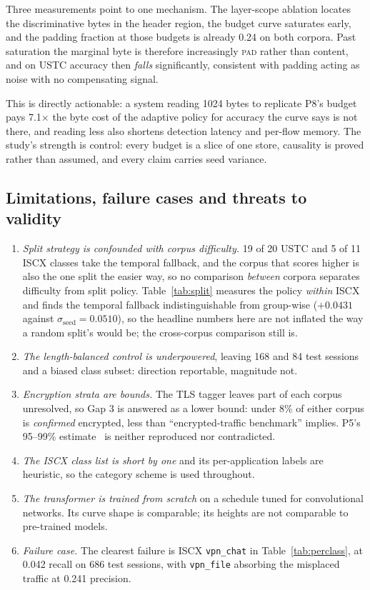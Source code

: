 \documentclass[pdflatex,sn-mathphys-num]{sn-jnl}
\theoremstyle{thmstyleone}%
\theoremstyle{thmstylethree}%
\begin{document}
Three measurements point to one mechanism. The layer-scope ablation locates
the discriminative bytes in the header region, the budget curve saturates
early, and the padding fraction at those budgets is already 0.24 on both
corpora. Past saturation the marginal byte is therefore increasingly
\textsc{pad} rather than content, and on USTC accuracy then \emph{falls}
significantly, consistent with padding acting as noise with no compensating
signal.

This is directly actionable: a system reading 1024 bytes to replicate P8's
budget pays 7.1$\times$ the byte cost of the adaptive policy for accuracy the
curve says is not there, and reading less also shortens detection latency and
per-flow memory. The study's strength is control: every budget is a slice of
one store, causality is proved rather than assumed, and every claim carries
seed variance.

\subsection{Limitations, failure cases and threats to validity}\label{subsec:limits}

\begin{enumerate}
\item \emph{Split strategy is confounded with corpus difficulty.} 19 of 20
USTC and 5 of 11 ISCX classes take the temporal fallback, and the corpus that
scores higher is also the one split the easier way, so no comparison
\emph{between} corpora separates difficulty from split policy.
Table~\ref{tab:split} measures the policy \emph{within} ISCX and finds the
temporal fallback indistinguishable from group-wise ($+0.0431$ against
$\sigma_{\text{seed}} = 0.0510$), so the headline numbers here are not inflated the
way a random split's would be; the cross-corpus comparison still is.
\item \emph{The length-balanced control is underpowered}, leaving 168 and 84
test sessions and a biased class subset: direction reportable, magnitude not.
\item \emph{Encryption strata are bounds.} The TLS tagger leaves part of each
corpus unresolved, so Gap 3 is answered as a lower bound: under 8\% of either
corpus is \emph{confirmed} encrypted, less than ``encrypted-traffic benchmark''
implies. P5's 95--99\% estimate~\cite{p5} is neither reproduced nor
contradicted.
\item \emph{The ISCX class list is short by one} and its per-application
labels are heuristic, so the category scheme is used throughout.
\item \emph{The transformer is trained from scratch} on a schedule tuned for
convolutional networks. Its curve shape is comparable; its heights are not
comparable to pre-trained models.
\item \emph{Failure case.} The clearest failure is ISCX \texttt{vpn\_chat}
in Table~\ref{tab:perclass}, at 0.042 recall on 686 test sessions, with
\texttt{vpn\_file} absorbing the misplaced traffic at 0.241 precision.
\end{enumerate}
\end{document}
